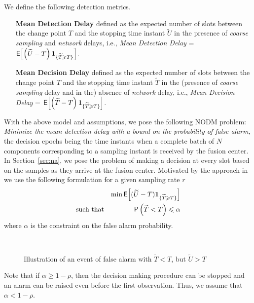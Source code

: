 \documentclass[acmtosn]{acmtrans2m}
\newcommand{\prob}[1]{\mathsf{P}\left(#1\right)}
\newcommand{\EXP}[1]{\mathsf{E}\!\left[#1\right]}
\begin{document}
We define the following detection metrics. 
\begin{itemize}
\item[{\bf Mean Detection Delay}] defined as the expected number of 
    slots between the change point $T$ and the stopping time instant 
    $\widetilde{U}$ in the presence of {\em coarse sampling} and 
    {\em network} delays,  i.e., {\em Mean Detection Delay} = 
    $\EXP{\left(\widetilde{U}-T\right){\bf 1}_{\{\widetilde{T} \geqslant T\}}}$. 
\item[{\bf Mean Decision Delay}] defined as the expected number of 
    slots between the change point $T$ and the stopping time instant 
    $\widetilde{T}$ in the (presence of {\em coarse sampling} delay 
    and in the) absence of {\em network} delay, i.e., {\em Mean Decision Delay} 
    = $\EXP{\left(\widetilde{T}-T\right){\bf 1}_{\{\widetilde{T} \geqslant T\}}}$. 
\end{itemize}
With the above model and assumptions, we pose the following {\sf NODM} problem:
\emph{Minimize the mean detection delay with a bound on the
  probability of false alarm}, the decision epochs being the time 
instants when a complete batch of $N$ components corresponding to 
a sampling instant is received by the fusion center. In 
Section~\ref{sec:na}, we pose the problem of making a 
decision at every slot based on the samples as they arrive at  
the fusion center.
Motivated by the approach
in~\cite{veeravalli01decentralized-quickest} we use the following
formulation for a given sampling rate $r$
\begin{eqnarray}
  \label{eq:p1}
  & & \min \EXP{(\widetilde{U}-T){\bf 1}_{\{\widetilde{T}\geqslant T\}}} \\ 
\text{such that}  & & \prob{\widetilde{T} < T}\leqslant \alpha \nonumber
\end{eqnarray}
where $\alpha$ is the constraint on the false alarm probability.
 \begin{figure}[h]
   \centering \ 
   \caption{ Illustration of an event of false alarm with
    $\widetilde{T}<T$, but $\widetilde{U}>T$}
   \label{fig:falsealarm}
 \end{figure}
\begin{remarks}
Note that if $\alpha \geqslant 1-\rho$, then the decision making procedure 
can be stopped and an alarm can be raised even before the first observation.
Thus, we assume that $\alpha < 1-\rho$.
\end{remarks}
\end{document}
